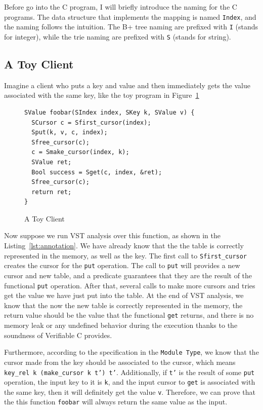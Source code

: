 \documentclass[runningheads]{llncs}
\begin{document}
Before go into the C program, I will briefly introduce the naming for the C
programs. The data structure that implements the mapping is named
\texttt{Index}, and the naming follows the intuition. The B+ tree naming are
prefixed with \texttt{I} (stands for integer), while the trie naming are
prefixed with \texttt{S} (stands for string). 

\subsection{A Toy Client}

Imagine a client who puts a key and value and then immediately gets the value
associated with the same key, like the toy program in Figure~\ref{fig:toy_client}

\begin{figure}[htbp]
  \centering
\begin{verbatim}
SValue foobar(SIndex index, SKey k, SValue v) {
  SCursor c = Sfirst_cursor(index);
  Sput(k, v, c, index);
  Sfree_cursor(c);
  c = Smake_cursor(index, k);
  SValue ret;
  Bool success = Sget(c, index, &ret);
  Sfree_cursor(c);
  return ret;
}
\end{verbatim}
  \caption{A Toy Client}\label{fig:toy_client}
\end{figure}

Now suppose we run VST analysis over this function, as shown in the
Listing~\ref{lst:annotation}. We have already know that the the table is
correctly represented in the memory, as well as the key. The first call to
\texttt{Sfirst\_cursor} creates the cursor for the \texttt{put} operation. The
call to \texttt{put} will provides a new cursor and new table, and a predicate
guarantees that they are the result of the functional \texttt{put} operation.
After that, several calls to make more cursors and tries get the value we
have just put into the table. At the end of VST analysis, we know that the now
the new table is correctly represented in the memory, the return value should be
the value that the functional \texttt{get} returns, and there is no memory leak
or any undefined behavior during the execution thanks to the soundness of
Verifiable C provides.

Furthermore, according to the specification in the \texttt{Module Type}, we know
that the cursor made from the key should be associated to the cursor, which
means \texttt{key\_rel k (make\_cursor k t') t'}. Additionally, if \texttt{t'} is
the result of some \texttt{put} operation, the input key to it is \texttt{k},
and the input cursor to \texttt{get} is associated with the same key, then it
will definitely get the value \texttt{v}. Therefore, we can prove that the this
function \texttt{foobar} will always return the same value as the input.
\end{document}
